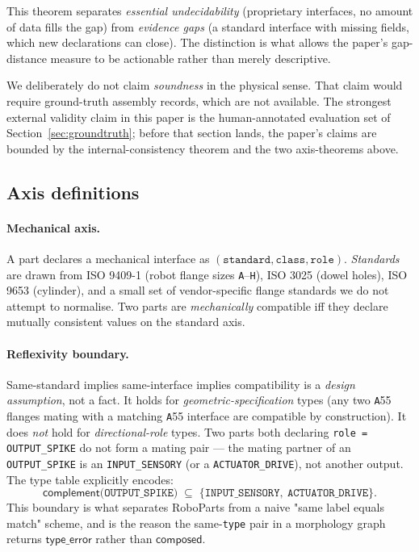 \documentclass[review]{elsarticle}
\begin{document}
This theorem separates \emph{essential undecidability} (proprietary
interfaces, no amount of data fills the gap) from
\emph{evidence gaps} (a standard interface with missing fields,
which new declarations can close). The distinction is what
allows the paper's gap-distance measure to be actionable rather
than merely descriptive.

We deliberately do not claim \emph{soundness} in the physical
sense. That claim would require ground-truth assembly records,
which are not available. The strongest external validity claim in
this paper is the human-annotated evaluation set of
Section~\ref{sec:groundtruth}; before that section lands, the
paper's claims are bounded by the internal-consistency theorem
and the two axis-theorems above.

\subsection{Axis definitions}

\paragraph{Mechanical axis.}
A part declares a mechanical interface as
$(\texttt{standard}, \texttt{class}, \texttt{role})$. \emph{Standards}
are drawn from ISO 9409-1 (robot flange sizes \texttt{A}--\texttt{H}),
ISO 3025 (dowel holes), ISO 9653 (cylinder), and a small set of
vendor-specific flange standards we do not attempt to normalise.
Two parts are \emph{mechanically} compatible iff they declare
mutually consistent values on the standard axis.

\paragraph{Reflexivity boundary.}
Same-standard implies same-interface implies compatibility is a
\emph{design assumption}, not a fact. It holds for
\emph{geometric-specification} types (any two \texttt{A}55 flanges
mating with a matching \texttt{A}55 interface are compatible by
construction). It does \emph{not} hold for \emph{directional-role}
types. Two parts both declaring \texttt{role = OUTPUT\_SPIKE} do not
form a mating pair — the mating partner of an \texttt{OUTPUT\_SPIKE}
is an \texttt{INPUT\_SENSORY} (or a \texttt{ACTUATOR\_DRIVE}), not
another output. The type table explicitly encodes:
\begin{equation}
  \mathsf{complement}\!\bigl(\texttt{OUTPUT\_SPIKE}\bigr) \;\subseteq\;
    \{\texttt{INPUT\_SENSORY},\ \texttt{ACTUATOR\_DRIVE}\}.
  \label{eq:complement}
\end{equation}
This boundary is what separates RoboParts from a naive "same label
equals match" scheme, and is the reason the same-\texttt{type} pair
in a morphology graph returns $\mathsf{type\_error}$ rather than
$\mathsf{composed}$.
\end{document}
